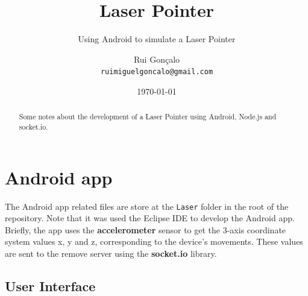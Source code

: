\documentclass{llncs}
\begin{document}
\sloppy

\pagestyle{myheadings}

\title{Laser Pointer}
\subtitle{Using Android to simulate a Laser Pointer}
\author{Rui Gonçalo
        \\{\scriptsize \texttt{ruimiguelgoncalo@gmail.com}}
       }
\date{\today}
\maketitle


\begin{abstract}
Some notes about the development of a Laser Pointer using Android, Node.js and socket.io.
\end{abstract}

\section{Android app}

The Android app related files are store at the \texttt{Laser} folder in the root of the repository. Note that it was used the Eclipse IDE to develop the Android app. Briefly, the app uses the \textbf{accelerometer} sensor to get the 3-axis coordinate system values x, y and z, corresponding to the device's movements. These values are sent to the remove server using the \textbf{socket.io} library.

\subsection{User Interface}
\end{document}
